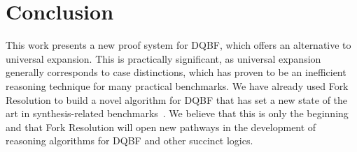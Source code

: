 \documentclass{svjour3}
\begin{document}
\section{Conclusion}
\label{sect:conclusion}

This work presents a new proof system for DQBF, which offers an alternative to universal expansion.
This is practically significant, as universal expansion generally corresponds to case distinctions, which has proven to be an inefficient reasoning technique for many practical benchmarks.
We have already used Fork Resolution to build a novel algorithm for DQBF that has set a new state of the art in synthesis-related benchmarks~\cite{TentrupRabe/2019/ClausalAbstractionForDQBF}.
We believe that this is only the beginning and that Fork Resolution will open new pathways in the development of reasoning algorithms for DQBF and other succinct logics.






\end{document}
